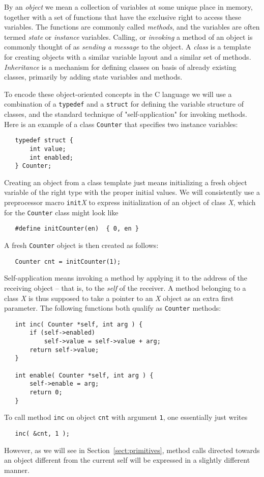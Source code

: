 \documentclass[12pt]{article}
\begin{document}
By an {\em object} we mean a collection of variables at some unique place in memory, together with a set of functions that have the exclusive right to access these variables.  The functions are commonly called {\em methods}, and the variables are often termed {\em state} or {\em instance} variables.  Calling, or {\em invoking} a method of an object is commonly thought of as {\em sending a message} to the object.  A {\em class} is a template for creating objects with a similar variable layout and a similar set of methods.  {\em Inheritance} is a mechanism for defining classes on basis of already existing classes, primarily by adding state variables and methods.

To encode these object-oriented concepts in the C language we will use a combination of a {\tt typedef} and a {\tt struct} for defining the variable structure of classes, and the standard technique of "self-application" for invoking methods.  Here is an example of a class {\tt Counter} that specifies two instance variables:
\begin{verbatim}
   typedef struct {
       int value;
       int enabled;
   } Counter;
\end{verbatim}
Creating an object from a class template just means initializing a fresh object variable of the right type with the proper initial values.  We will consistently use a preprocessor macro {\tt init}{\em X} to express initialization of an object of class {\em X}, which for the {\tt Counter} class might look like
\begin{verbatim}
   #define initCounter(en)  { 0, en }
\end{verbatim}
A fresh {\tt Counter} object is then created as follows:
\begin{verbatim}
   Counter cnt = initCounter(1);
\end{verbatim}

Self-application means invoking a method by applying it to the address of the receiving object -- that is, to the {\em self} of the receiver.  A method belonging to a class {\em X} is thus supposed to take a pointer to an {\em X} object as an extra first parameter.  The following functions both qualify as {\tt Counter} methods:
\begin{verbatim}
   int inc( Counter *self, int arg ) {
       if (self->enabled)
           self->value = self->value + arg;
       return self->value;
   }
   
   int enable( Counter *self, int arg ) {
       self->enable = arg;
       return 0;
   }
\end{verbatim}
To call method {\tt inc} on object {\tt cnt} with argument {\tt 1}, one essentially just writes
\begin{verbatim}
   inc( &cnt, 1 );
\end{verbatim}
However, as we will see in Section~\ref{sect:primitives}, method calls directed towards an object different from the current self will be expressed in a slightly different manner.
\end{document}

